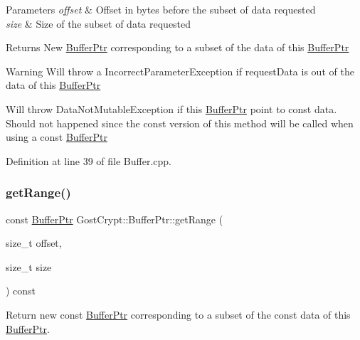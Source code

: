 \begin{DoxyParams}{Parameters}
{\em offset} & Offset in bytes before the subset of data requested \\
\hline
{\em size} & Size of the subset of data requested \\
\hline
\end{DoxyParams}
\begin{DoxyReturn}{Returns}
New \hyperlink{class_gost_crypt_1_1_buffer_ptr}{Buffer\+Ptr} corresponding to a subset of the data of this \hyperlink{class_gost_crypt_1_1_buffer_ptr}{Buffer\+Ptr} 
\end{DoxyReturn}
\begin{DoxyWarning}{Warning}
Will throw a Incorrect\+Parameter\+Exception if request\+Data is out of the data of this \hyperlink{class_gost_crypt_1_1_buffer_ptr}{Buffer\+Ptr} 

Will throw Data\+Not\+Mutable\+Exception if this \hyperlink{class_gost_crypt_1_1_buffer_ptr}{Buffer\+Ptr} point to const data. Should not happened since the const version of this method will be called when using a const \hyperlink{class_gost_crypt_1_1_buffer_ptr}{Buffer\+Ptr} 
\end{DoxyWarning}


Definition at line 39 of file Buffer.\+cpp.

\mbox{\label{class_gost_crypt_1_1_buffer_ptr_a73110b347e30b1b69b63a1cb96c9aca8}} 
\subsubsection{\texorpdfstring{get\+Range()}{getRange()}\hspace{0.1cm}{\footnotesize\ttfamily [2/2]}}
{\footnotesize\ttfamily const \hyperlink{class_gost_crypt_1_1_buffer_ptr}{Buffer\+Ptr} Gost\+Crypt\+::\+Buffer\+Ptr\+::get\+Range (\begin{DoxyParamCaption}\item[{size\+\_\+t}]{offset,  }\item[{size\+\_\+t}]{size }\end{DoxyParamCaption}) const}



Return new const \hyperlink{class_gost_crypt_1_1_buffer_ptr}{Buffer\+Ptr} corresponding to a subset of the const data of this \hyperlink{class_gost_crypt_1_1_buffer_ptr}{Buffer\+Ptr}. 


